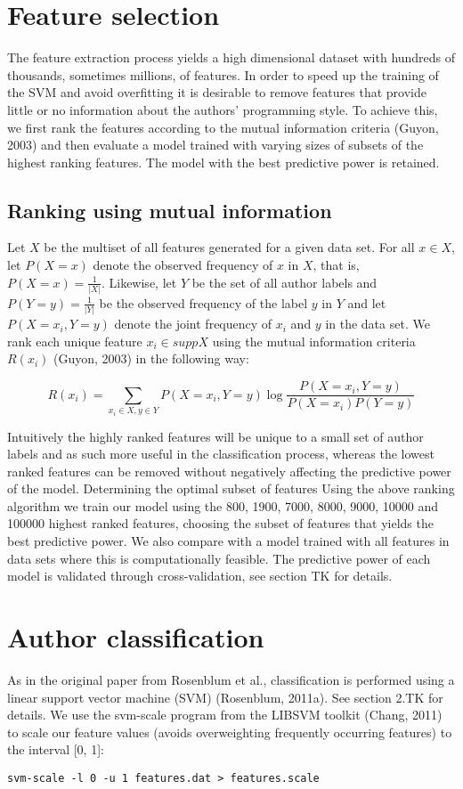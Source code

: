 \documentclass[a4paper,11pt]{kth-mag}
\begin{document}
\section{Feature selection}
The feature extraction process yields a high dimensional dataset with hundreds
of thousands, sometimes millions, of features. In order to speed up the
training of the SVM and avoid overfitting it is desirable to remove features
that provide little or no information about the authors’ programming style. To
achieve this, we first rank the features according to the mutual information
criteria (Guyon, 2003) and then evaluate a model trained with varying sizes of
subsets of the highest ranking features. The model with the best predictive
power is retained.

\subsection{Ranking using mutual information}
Let $X$ be the multiset of all features generated for a given data set. For all
$x \in X$, let $P(X = x)$ denote the observed frequency of $x$ in $X$, that is,
$P(X = x) = \frac{1}{|X|}$. Likewise, let $Y$ be the set of all author labels
and $P(Y = y)= \frac{1}{|Y|}$ be the observed frequency of the label $y$ in $Y$
and let $P(X=x_i,Y=y)$ denote the joint frequency of $x_i$ and $y$ in the data
set. We rank each unique feature $x_i \in supp X $ using the mutual information
criteria $R(x_i)$ (Guyon, 2003) in the following way:

$$R(x_i)= \sum_{x_i \in X, y \in Y} P(X=x_i,Y=y) \log \frac{P(X = x_i,
Y = y)}{P(X = x_i)P(Y = y)}$$

Intuitively the highly ranked features will be unique to a small set of author
labels and as such more useful in the classification process, whereas the
lowest ranked features can be removed without negatively affecting the
predictive power of the model.  Determining the optimal subset of features
Using the above ranking algorithm we train our model using the 800, 1900, 7000,
8000, 9000, 10000 and 100000 highest ranked features, choosing the subset of
features that yields the best predictive power. We also compare with a model
trained with all features in data sets where this is computationally feasible.
The predictive power of each model is validated through cross-validation, see
section TK for details.

\section{Author classification}
As in the original paper from Rosenblum et al., classification is performed
using a linear support vector machine (SVM) (Rosenblum, 2011a). See section
2.TK for details. We use the svm-scale program from the LIBSVM toolkit (Chang,
2011) to scale our feature values (avoids overweighting frequently occurring
features) to the interval [0, 1]:
\begin{lstlisting}
svm-scale -l 0 -u 1 features.dat > features.scale
\end{lstlisting}
\end{document}
